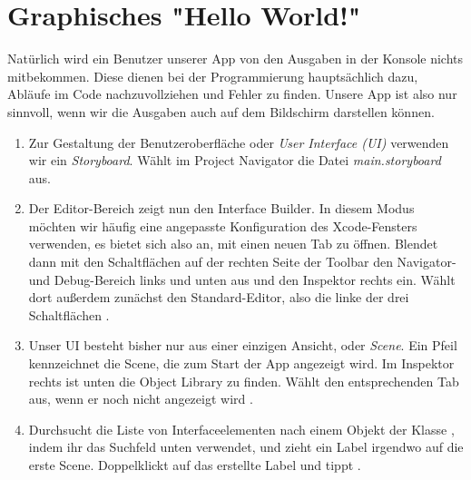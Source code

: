 \documentclass[parskip=half, final]{scrreprt}
\begin{document}
\begin{lecture}
\begin{enumerate}
\end{enumerate}


\section{Graphisches "{}Hello World!"{}}

Natürlich wird ein Benutzer unserer App von den Ausgaben in der Konsole nichts mitbekommen. Diese dienen bei der Programmierung hauptsächlich dazu, Abläufe im Code nachzuvollziehen und Fehler zu finden. Unsere App ist also nur sinnvoll, wenn wir die Ausgaben auch auf dem Bildschirm darstellen können.


\begin{enumerate}

\item Zur Gestaltung der Benutzeroberfläche oder \emph{User Interface (UI)} verwenden wir ein \emph{Storyboard}. Wählt im Project Navigator die Datei \emph{main.storyboard} aus.

\item Der Editor-Bereich zeigt nun den Interface Builder. In diesem Modus möchten wir häufig eine angepasste Konfiguration des Xcode-Fensters verwenden, es bietet sich also an, mit  einen neuen Tab zu öffnen. Blendet dann mit den Schaltflächen auf der rechten Seite der Toolbar den Navigator- und Debug-Bereich links und unten aus und den Inspektor rechts ein. Wählt dort außerdem zunächst den Standard-Editor, also die linke der drei Schaltflächen .


\item Unser UI besteht bisher nur aus einer einzigen Ansicht, oder \emph{Scene}. Ein Pfeil kennzeichnet die Scene, die zum Start der App angezeigt wird. Im Inspektor rechts ist unten die Object Library zu finden. Wählt den entsprechenden Tab aus, wenn er noch nicht angezeigt wird .

\item Durchsucht die Liste von Interfaceelementen nach einem Objekt der Klasse , indem ihr das Suchfeld unten verwendet, und zieht ein Label irgendwo auf die erste Scene. Doppelklickt auf das erstellte Label und tippt .


\end{enumerate}
\end{lecture}
\end{document}
